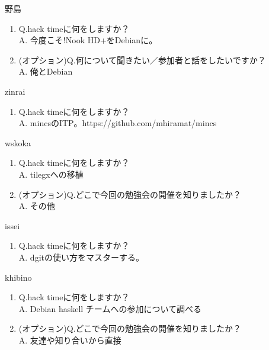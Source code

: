 \begin{prework}{ 野島 }
  \begin{enumerate}
  \item Q.hack timeに何をしますか？\\
    A. 今度こそ!Nook HD+をDebianに。
  \item (オプション)Q.何について聞きたい／参加者と話をしたいですか？\\
    A. 俺とDebian
  \end{enumerate}
\end{prework}

\begin{prework}{ zinrai }
  \begin{enumerate}
  \item Q.hack timeに何をしますか？\\
    A. mincsのITP。https://github.com/mhiramat/mincs
  \end{enumerate}
\end{prework}

\begin{prework}{ wskoka }
  \begin{enumerate}
  \item Q.hack timeに何をしますか？\\
    A. tilegxへの移植
  \item (オプション)Q.どこで今回の勉強会の開催を知りましたか？\\
    A. その他
  \end{enumerate}
\end{prework}

\begin{prework}{ issei }
  \begin{enumerate}
  \item Q.hack timeに何をしますか？\\
    A. dgitの使い方をマスターする。
  \end{enumerate}
\end{prework}

\begin{prework}{ khibino }
  \begin{enumerate}
  \item Q.hack timeに何をしますか？\\
    A. Debian haskell チームへの参加について調べる
  \item (オプション)Q.どこで今回の勉強会の開催を知りましたか？\\
    A. 友達や知り合いから直接
  \end{enumerate}
\end{prework}

